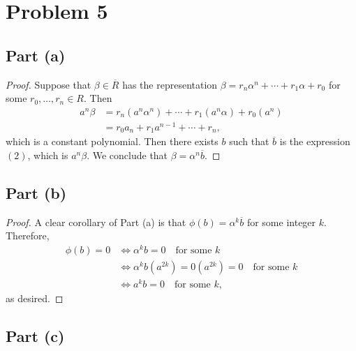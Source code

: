 \documentclass[11pt]{article}
\begin{document}

\section{Problem 5}


\subsection*{Part (a)}

\begin{proof}
  Suppose that $\beta \in \overline{R}$ has the representation $\beta = r_{n} \alpha^{n} + \cdots + r_{1} \alpha + r_{0}$ for some $r_{0}, \ldots, r_{n} \in R$. Then
  \begin{align}
    a^{n} \beta &= r_{n} (a^{n} \alpha^{n}) + \cdots + r_{1} (a^{n} \alpha) + r_{0} (a^{n}) \\
              &= r_{0} a_{n} + r_{1} a^{n - 1} + \cdots + r_{n},
  \end{align}
  which is a constant polynomial. Then there exists $b$ such that $\overline{b}$ is the expression $(2)$, which is $a^{n} \beta$. We conclude that $\beta = \alpha^{n} \overline{b}$.
\end{proof}


\subsection*{Part (b)}

\begin{proof}
  A clear corollary of Part (a) is that $\phi(b) = \alpha^{k} \overline{b}$ for some integer $k$. Therefore,
  \begin{align*}
    \phi(b) = 0 & \iff \alpha^{k}b = 0 \quad \text{for some $k$} \\
                & \iff \alpha^{k}b (a^{2k}) = 0(a^{2k}) = 0 \quad \text{for some $k$} \\
                & \iff a^{k}b = 0 \quad \text{for some $k$},
  \end{align*}
  as desired.
\end{proof}


\subsection*{Part (c)}
\end{document}
